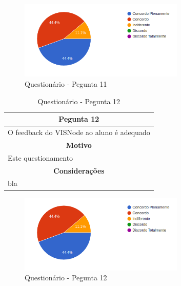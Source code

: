 \documentclass[
	12pt,				%
	oneside,			%
	a4paper,			%
	english,			%
	french,				%
	spanish,			%
	brazil,				%
	]{abntex2}
\begin{document}
\begin{figure}[H]
\centering
\caption{Questionário - Pegunta 11}
\includegraphics[width=0.7\textwidth]{imagens/v1/p11.png}
\sourceAuthor
\end{figure}

\begin{table}[H]
\centering
\caption{Questionário - Pegunta 12} 
\def\arraystretch{1.5}
\begin{tabular}{l}
\hline
\multicolumn{1}{c}{\textbf{Pegunta 12}}              \\ \hline
O feedback do VISNode ao aluno é adequado \\ \hline
\multicolumn{1}{c}{\textbf{Motivo}}                 \\ \hline
Este questionamento                                   \\ \hline
\multicolumn{1}{c}{\textbf{Considerações}}          \\ \hline
bla                                                   \\ \hline
\end{tabular}
\sourceAuthor
\end{table}

\begin{figure}[H]
\centering
\caption{Questionário - Pegunta 12}
\includegraphics[width=0.7\textwidth]{imagens/v1/p12.png}
\sourceAuthor
\end{figure}
\end{document}
